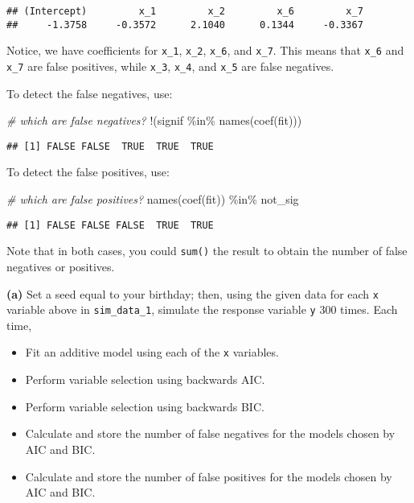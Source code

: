 \documentclass[
]{article}
\newenvironment{Shaded}{\begin{snugshade}}{\end{snugshade}}
\newcommand{\CommentTok}[1]{\textcolor[rgb]{0.56,0.35,0.01}{\textit{#1}}}
\newcommand{\FunctionTok}[1]{\textcolor[rgb]{0.00,0.00,0.00}{#1}}
\newcommand{\NormalTok}[1]{#1}
\newcommand{\SpecialCharTok}[1]{\textcolor[rgb]{0.00,0.00,0.00}{#1}}
\providecommand{\tightlist}{%
  \setlength{\itemsep}{0pt}\setlength{\parskip}{0pt}}
\begin{document}
\begin{verbatim}
## (Intercept)         x_1         x_2         x_6         x_7 
##     -1.3758     -0.3572      2.1040      0.1344     -0.3367
\end{verbatim}

Notice, we have coefficients for \texttt{x\_1}, \texttt{x\_2},
\texttt{x\_6}, and \texttt{x\_7}. This means that \texttt{x\_6} and
\texttt{x\_7} are false positives, while \texttt{x\_3}, \texttt{x\_4},
and \texttt{x\_5} are false negatives.

To detect the false negatives, use:

\begin{Shaded}
\begin{Highlighting}[]
\CommentTok{\# which are false negatives?}
\SpecialCharTok{!}\NormalTok{(signif }\SpecialCharTok{\%in\%} \FunctionTok{names}\NormalTok{(}\FunctionTok{coef}\NormalTok{(fit)))}
\end{Highlighting}
\end{Shaded}

\begin{verbatim}
## [1] FALSE FALSE  TRUE  TRUE  TRUE
\end{verbatim}

To detect the false positives, use:

\begin{Shaded}
\begin{Highlighting}[]
\CommentTok{\# which are false positives?}
\FunctionTok{names}\NormalTok{(}\FunctionTok{coef}\NormalTok{(fit)) }\SpecialCharTok{\%in\%}\NormalTok{ not\_sig}
\end{Highlighting}
\end{Shaded}

\begin{verbatim}
## [1] FALSE FALSE FALSE  TRUE  TRUE
\end{verbatim}

Note that in both cases, you could \texttt{sum()} the result to obtain
the number of false negatives or positives.

\textbf{(a)} Set a seed equal to your birthday; then, using the given
data for each \texttt{x} variable above in \texttt{sim\_data\_1},
simulate the response variable \texttt{y} 300 times. Each time,

\begin{itemize}
\tightlist
\item
  Fit an additive model using each of the \texttt{x} variables.
\item
  Perform variable selection using backwards AIC.
\item
  Perform variable selection using backwards BIC.
\item
  Calculate and store the number of false negatives for the models
  chosen by AIC and BIC.
\item
  Calculate and store the number of false positives for the models
  chosen by AIC and BIC.
\end{itemize}
\end{document}
